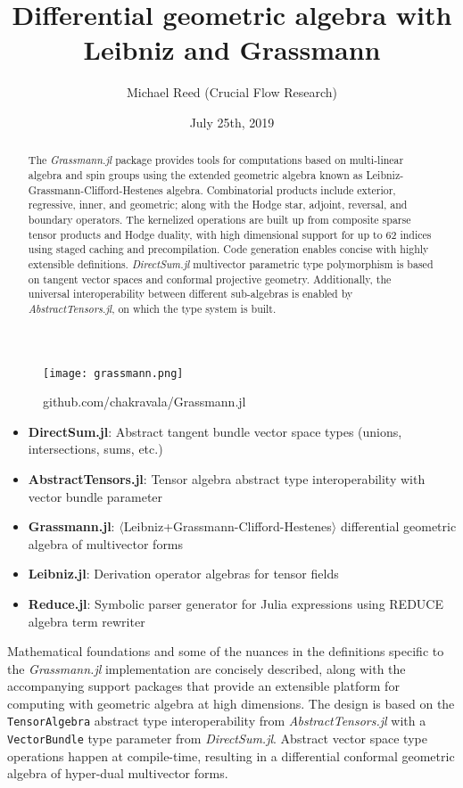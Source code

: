 \documentclass{juliacon}
\author{Michael Reed (Crucial Flow Research)}
\title{Differential geometric algebra with Leibniz and Grassmann}
\date{July 25th, 2019}
\begin{document}
%

\maketitle
\begin{figure}[ht]
\centerline{\texttt{[image: grassmann.png]}}
\caption*{github.com/chakravala/Grassmann.jl}
\end{figure}
\begin{itemize}
	\item \textbf{DirectSum.jl}: Abstract tangent bundle vector space types (unions, intersections, sums, etc.)
	\item \textbf{AbstractTensors.jl}: Tensor algebra abstract type interoperability with vector bundle parameter	
	\item \textbf{Grassmann.jl}: $\langle$Leibniz+Grassmann-Clifford-Hestenes$\rangle$ differential geometric algebra of multivector forms
	\item \textbf{Leibniz.jl}: Derivation operator algebras for tensor fields
	\item \textbf{Reduce.jl}: Symbolic parser generator for Julia expressions using REDUCE algebra term rewriter
\end{itemize}
\begin{abstract}
	The \textit{Grassmann.jl}
	package provides tools for computations based on multi-linear algebra and spin groups using the extended geometric algebra known as Leibniz-Grassmann-Clifford-Hestenes algebra.
	Combinatorial products include
	exterior, regressive, inner, and geometric; along with the Hodge star, adjoint, reversal, and boundary operators.
	The kernelized operations are built up from composite sparse tensor products and Hodge duality, with high dimensional support for up to 62 indices using staged caching and precompilation. Code generation enables concise with highly extensible definitions.
	\textit{DirectSum.jl}
	multivector parametric type polymorphism is based on tangent vector spaces and conformal projective geometry.
	Additionally, the universal interoperability between different sub-algebras is enabled by \textit{AbstractTensors.jl},
	on which the type system is built.
\end{abstract}
Mathematical foundations and some of the nuances in the definitions specific to the \textit{Grassmann.jl} implementation are concisely described, along with the accompanying support packages that provide an extensible platform for computing with geometric algebra at high dimensions.
The design is based on the \verb`TensorAlgebra` abstract type interoperability from \textit{AbstractTensors.jl} with a \verb`VectorBundle` type parameter from \textit{DirectSum.jl}. Abstract vector space type operations happen at compile-time, resulting in a differential conformal geometric algebra of hyper-dual multivector forms.
\end{document}

